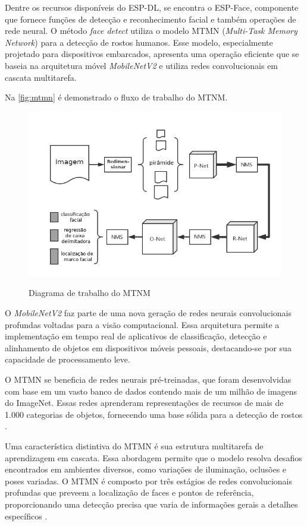Dentre os recursos disponíveis do ESP-DL, se encontra o 
ESP-Face, componente que fornece funções de detecção e 
reconhecimento facial e também operações de rede neural. 
O método \textit{face detect} utiliza o modelo MTMN (\textit{Multi-Task 
Memory Network}) para a detecção de rostos humanos. 
Esse modelo, especialmente projetado para dispositivos 
embarcados, apresenta uma operação eficiente que se 
baseia na arquitetura móvel \textit{MobileNetV2} e utiliza 
redes convolucionais em cascata multitarefa.

Na \autoref{fig:mtmn} é demonstrado o fluxo de trabalho do MTNM.

\begin{figure}[h!]
    \centering
    \caption{Diagrama de trabalho do MTNM}
    \includegraphics[scale=0.5]{figuras/mtmn.png}
    \label{fig:mtmn}
    \centering
\end{figure}

O \textit{MobileNetV2} faz parte de uma nova geração de redes 
neurais convolucionais profundas voltadas para a 
visão computacional. Essa arquitetura permite a 
implementação em tempo real de aplicativos de 
classificação, detecção e alinhamento de objetos 
em dispositivos móveis pessoais, destacando-se por 
sua capacidade de processamento leve.

O MTMN se beneficia de redes neurais pré-treinadas, 
que foram desenvolvidas com base em um vasto banco de 
dados contendo mais de um milhão de imagens do ImageNet. 
Essas redes aprenderam representações de recursos de 
mais de 1.000 categorias de objetos, fornecendo uma 
base sólida para a detecção de rostos \cite{luna2022}.

Uma característica distintiva do MTMN é sua estrutura 
multitarefa de aprendizagem em cascata. Essa abordagem 
permite que o modelo resolva desafios encontrados em 
ambientes diversos, como variações de iluminação, 
oclusões e poses variadas. O MTMN é composto por três 
estágios de redes convolucionais profundas que preveem a 
localização de faces e pontos de referência, proporcionando 
uma detecção precisa que varia de informações gerais a 
detalhes específicos \cite{luna2022}.

